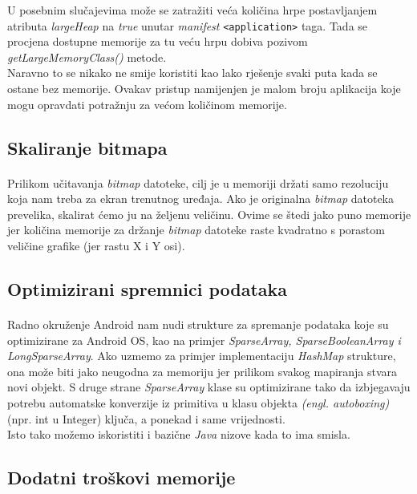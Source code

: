 \documentclass[times, utf8, zavrsni]{fer}
\begin{document}
U posebnim slučajevima može se zatražiti veća količina hrpe postavljanjem atributa \textit{largeHeap} na \textit{true} unutar \textit{manifest} \verb|<application>| taga. Tada se procjena dostupne memorije za tu veću hrpu dobiva pozivom \textit{getLargeMemoryClass()} metode.\\

Naravno to se nikako ne smije koristiti kao lako rješenje svaki puta kada se ostane bez memorije. Ovakav pristup namijenjen je malom broju aplikacija koje mogu opravdati potražnju za većom količinom memorije.

\subsection{Skaliranje bitmapa}
\paragraph{}
Prilikom učitavanja \textit{bitmap} datoteke, cilj je u memoriji držati samo rezoluciju koja nam treba za ekran trenutnog uređaja. Ako je originalna \textit{bitmap} datoteka prevelika, skalirat ćemo ju na željenu veličinu. Ovime se štedi jako puno memorije jer količina memorije za držanje \textit{bitmap} datoteke raste kvadratno s porastom veličine grafike (jer rastu X i Y osi).

\subsection{Optimizirani spremnici podataka}
\paragraph{}
Radno okruženje Android nam nudi strukture za spremanje podataka koje su optimizirane za Android OS, kao na primjer \textit{SparseArray, SparseBooleanArray i LongSparseArray}. Ako uzmemo za primjer implementaciju \textit{HashMap} strukture, ona može biti jako neugodna za memoriju jer prilikom svakog mapiranja stvara novi objekt. S druge strane \textit{SparseArray} klase su optimizirane tako da izbjegavaju potrebu automatske konverzije iz primitiva u klasu objekta \textit{(engl. autoboxing)}(npr. int u Integer) ključa, a ponekad i same vrijednosti.\\

Isto tako možemo iskoristiti i bazične \textit{Java} nizove kada to ima smisla.

\subsection{Dodatni troškovi memorije}
\end{document}

